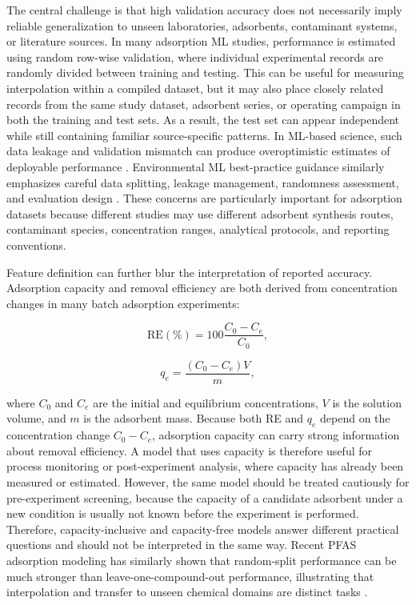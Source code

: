 \documentclass[review,12pt,number]{elsarticle}
\begin{document}
The central challenge is that high validation accuracy does not necessarily imply reliable generalization to unseen laboratories, adsorbents, contaminant systems, or literature sources. In many adsorption ML studies, performance is estimated using random row-wise validation, where individual experimental records are randomly divided between training and testing. This can be useful for measuring interpolation within a compiled dataset, but it may also place closely related records from the same study dataset, adsorbent series, or operating campaign in both the training and test sets. As a result, the test set can appear independent while still containing familiar source-specific patterns. In ML-based science, such data leakage and validation mismatch can produce overoptimistic estimates of deployable performance \cite{kapoor2023}. Environmental ML best-practice guidance similarly emphasizes careful data splitting, leakage management, randomness assessment, and evaluation design \cite{zhu2023}. These concerns are particularly important for adsorption datasets because different studies may use different adsorbent synthesis routes, contaminant species, concentration ranges, analytical protocols, and reporting conventions.

Feature definition can further blur the interpretation of reported accuracy. Adsorption capacity and removal efficiency are both derived from concentration changes in many batch adsorption experiments:

\begin{equation}
\mathrm{RE}(\%) = 100\frac{C_0-C_e}{C_0},
\end{equation}

\begin{equation}
q_e = \frac{(C_0-C_e)V}{m},
\end{equation}

where $C_0$ and $C_e$ are the initial and equilibrium concentrations, $V$ is the solution volume, and $m$ is the adsorbent mass. Because both RE and $q_e$ depend on the concentration change $C_0-C_e$, adsorption capacity can carry strong information about removal efficiency. A model that uses capacity is therefore useful for process monitoring or post-experiment analysis, where capacity has already been measured or estimated. However, the same model should be treated cautiously for pre-experiment screening, because the capacity of a candidate adsorbent under a new condition is usually not known before the experiment is performed. Therefore, capacity-inclusive and capacity-free models answer different practical questions and should not be interpreted in the same way. Recent PFAS adsorption modeling has similarly shown that random-split performance can be much stronger than leave-one-compound-out performance, illustrating that interpolation and transfer to unseen chemical domains are distinct tasks \cite{patel2026}.
\end{document}
